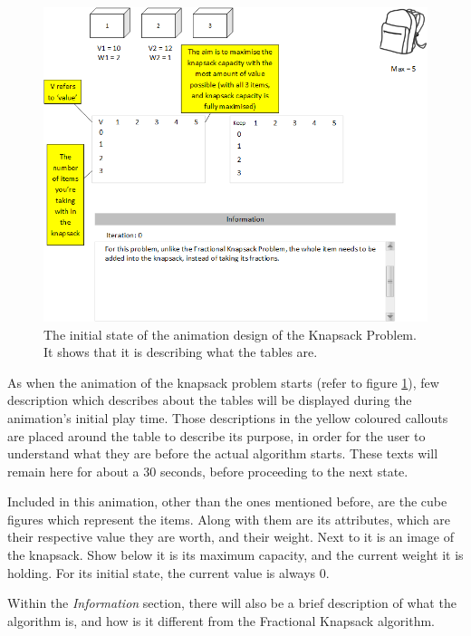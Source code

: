 \begin{figure}[H]
\centering
\includegraphics[scale=0.7]{images/report_images/animationDesignKnapsackProblem.png}
\caption{The initial state of the animation design of the Knapsack Problem. It shows that it is describing what the tables are.}
\label{animationDesignKnapsackProblem}
\end{figure}


As when the animation of the knapsack problem starts (refer to figure \ref{animationDesignKnapsackProblem}), few description which describes about the tables will be displayed during the animation's initial play time. Those descriptions in the yellow coloured callouts are placed around the table to describe its purpose, in order for the user to understand what they are before the actual algorithm starts. These texts will remain here for about a 30 seconds, before proceeding to the next state.

Included in this animation, other than the ones mentioned before, are the cube figures which represent the items. Along with them are its attributes, which are their respective value they are worth, and their weight. Next to it is an image of the knapsack. Show below it is its maximum capacity, and the current weight it is holding. For its initial state, the current value is always 0.

Within the \textit{Information} section, there will also be a brief description of what the algorithm is, and how is it different from the Fractional Knapsack algorithm. 

